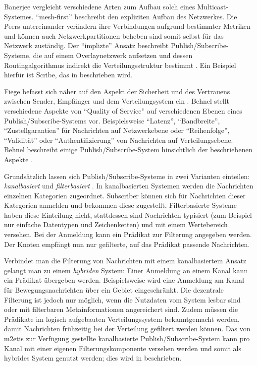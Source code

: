 Banerjee vergleicht verschiedene Arten zum Aufbau solch eines Multicast-Systemes. \enquote{mesh-first} beschreibt den expliziten Aufbau des Netzwerkes. Die Peers untereinander verändern ihre Verbindungen aufgrund bestimmter Metriken und können auch Netzwerkpartitionen beheben sind somit selbst für das Netzwerk zuständig. Der \enquote{implizte} Ansatz beschreibt Publish/Subscribe-Systeme, die auf einem Overlaynetzwerk aufsetzen und dessen Routingalgorithmus indirekt die Verteilungsstruktur bestimmt \cite{Banerjee2001Comparative}. Ein Beispiel hierfür ist Scribe, das in  beschrieben wird.

Fiege befasst sich näher auf den Aspekt der Sicherheit und des Vertrauens zwischen Sender, Empfänger und dem Verteilungsystem ein \cite{FiegeSecurity}. Behnel stellt verschiedene Aspekte von \enquote{Quality of Service} auf verschiedenen Ebenen eines Publish/Subscribe-Systems vor. Beispielsweise \enquote{Latenz}, \enquote{Bandbreite}, \enquote{Zustellgarantien} für Nachrichten auf Netzwerkebene oder \enquote{Reihenfolge}, \enquote{Validität} oder \enquote{Authentifizierung} von Nachrichten auf Verteilungsebene. Behnel beschreibt einige Publish/Subscribe-System hinsichtlich der beschriebenen Aspekte \cite{BeFiMu2006PubSubQoS}. 

Grundsätzlich lassen sich Publish/Subscribe-Systeme in zwei Varianten einteilen: \emph{kanalbasiert} und \emph{filterbasiert} \cite{Liu2003Survey}. In kanalbasierten Systemen werden die Nachrichten einzelnen Kategorien zugeordnet. Subscriber können sich für Nachrichten dieser Kategorien anmelden und bekommen diese zugestellt. Filterbasierte Systeme haben diese Einteilung nicht, stattdessen sind Nachrichten typisiert (zum Beispiel nur einfache Datentypen und Zeichenketten) und mit einem Wertebereich versehen. Bei der Anmeldung kann ein Prädikat zur Filterung angegeben werden. Der Knoten empfängt nun nur gefilterte, auf das Prädikat passende Nachrichten.

Verbindet man die Filterung von Nachrichten mit einem kanalbasiertem Ansatz gelangt man zu einem \emph{hybriden} System: Einer Anmeldung an einem Kanal kann ein Prädikat übergeben werden. Beispielsweise wird eine Anmeldung am Kanal für Bewegungsnachrichten über ein Gebiet eingeschränkt. Die dezentrale Filterung ist jedoch nur möglich, wenn die Nutzdaten vom System lesbar sind oder mit filterbaren Metainformationen angereichert sind. Zudem müssen die Prädikate im logisch aufgebauten Verteilungssystem bekanntgemacht werden, damit Nachrichten frühzeitig bei der Verteilung gefiltert werden können. Das von \ac{m2etis} zur Verfügung gestellte kanalbasierte Publish/Subscribe-System kann pro Kanal mit einer eigenen Filterungskomponente versehen werden und somit als hybrides System genutzt werden; dies wird in  beschrieben.



